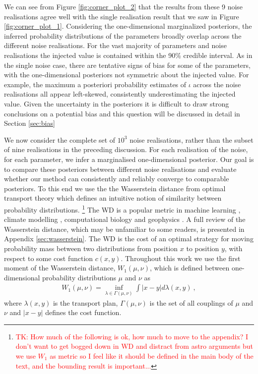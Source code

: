 \documentclass[fleqn,usenatbib,useAMS]{mnras}
\providecommand{\DIFdelbegin}{} %
\newcommand{\DIFscaledelfig}{0.5}
\newlength{\DIFdelgraphicswidth} %
\newlength{\DIFdelgraphicsheight} %
\newcommand{\DIFdelincludegraphics}[2][]{%
\sbox{\DIFdelgraphicsbox}{\DIFOincludegraphics[#1]{#2}}%
\settoboxwidth{\DIFdelgraphicswidth}{\DIFdelgraphicsbox} %
\settoboxtotalheight{\DIFdelgraphicsheight}{\DIFdelgraphicsbox} %
\scalebox{\DIFscaledelfig}{%
\parbox[b]{\DIFdelgraphicswidth}{\usebox{\DIFdelgraphicsbox}\\[-\baselineskip] \rule{\DIFdelgraphicswidth}{0em}}\llap{\resizebox{\DIFdelgraphicswidth}{\DIFdelgraphicsheight}{%
\setlength{\unitlength}{\DIFdelgraphicswidth}%
\begin{picture}(1,1)%
\thicklines\linethickness{2pt} %
{\color[rgb]{1,0,0}\put(0,0){\framebox(1,1){}}}%
{\color[rgb]{1,0,0}\put(0,0){\line( 1,1){1}}}%
{\color[rgb]{1,0,0}\put(0,1){\line(1,-1){1}}}%
\end{picture}%
}\hspace*{3pt}}} %
} %
\DeclareRobustCommand{\DIFdelbegin}{\DIFOdelbegin \let\includegraphics\DIFdelincludegraphics} %
\begin{document}
We can see from Figure \ref{fig:corner_plot_2} that the results from these 9 noise realisations agree well with the single realisation result that we saw in  Figure \ref{fig:corner_plot_1}. Considering the one-dimensional marginalized posteriors, the inferred probability distributions of the parameters broadly overlap across the different noise realisations. For the vast majority of parameters and noise realisations the injected value is contained within the 90\% credible interval. As in the single noise case, there are tentative signs of bias for some of the parameters, with the one-dimensional posteriors not symmetric about the injected value. For example, the maximum a posteriori probability estimates of $\iota$ across the noise realisations all appear left-skewed, consistently underestimating the injected value. Given the uncertainty in the posteriors it is difficult to draw strong conclusions on a potential bias and this question will be discussed in detail in Section \ref{sec:bias} \newline 


We now consider the complete set of $10^3$ noise realisations, rather than the subset of nine realisations in the preceding discussion. For each realisation of the noise, for each parameter, we infer a marginalised one-dimensional posterior. Our goal is to compare these posteriors between different noise realisations and evaluate whether our method can consistently and reliably converge to comparable posteriors. To this end we use the the Wasserstein distance \citep[WD;][]{Wasserstein,Villani2009} from optimal transport theory which defines an intuitive notion of similarity between probability distributions. \footnote{\textcolor{red}{\tiny TK: How much of the following is ok, how much to move to the appendix? I don't want to get bogged down in WD and distract from astro arguments but we use $W_1$ as metric so I feel like it should be defined in the main body of the text, and the bounding result is important...} \normalsize} The WD is a popular metric in machine learning \citep{2017arXiv170107875A}, climate modelling \citep{2022JCli...35.1215P,2023QJRMS.149..843K}, computational biology \citep{GONZALEZDELGADO2023168053} and geophysics \citep{2023GeoRL..5003880M}. A full review of the Wasserstein distance, which may be unfamiliar to some readers, is presented in Appendix \ref{sec:wasserstein}. The WD is the cost of an optimal strategy for moving probability mass between two distributions from position $x$ to position $y$, with respect to some cost function $c(x,y)$. Throughout this work we use the first moment of the Wasserstein distance, $W_1(\mu,\nu)$, which is defined between one-dimensional probability distributions $\mu$ and $\nu$ as
\begin{eqnarray}
	W_1(\mu,\nu)=  \inf_{\lambda \in \Gamma(\mu, \nu)} \int |x-y| d \lambda (x,y) \ ,
\end{eqnarray}
where $\lambda(x,y)$ is the transport plan, $\Gamma(\mu, \nu)$ is the set of all couplings of $\mu$ and $\nu$ and $ |x-y|$ defines the cost function. \DIFdelbegin %
\end{document}
